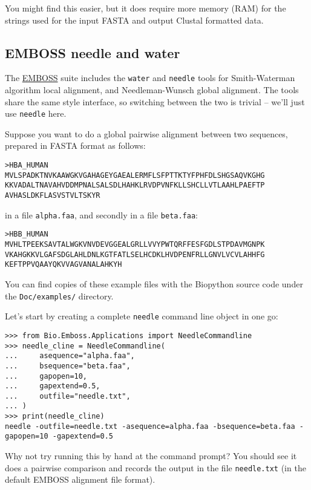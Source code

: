You might find this easier, but it does require more memory (RAM) for the strings
used for the input FASTA and output Clustal formatted data.

\subsection{EMBOSS needle and water}
\label{sec:emboss-needle-water}
The \href{http://emboss.sourceforge.net/}{EMBOSS} suite includes the \texttt{water} and
\texttt{needle} tools for Smith-Waterman algorithm local alignment, and Needleman-Wunsch
global alignment. The tools share the same style interface, so switching between the two
is trivial -- we'll just use \texttt{needle} here.

Suppose you want to do a global pairwise alignment between two sequences, prepared in
FASTA format as follows:

\begin{verbatim}
>HBA_HUMAN
MVLSPADKTNVKAAWGKVGAHAGEYGAEALERMFLSFPTTKTYFPHFDLSHGSAQVKGHG
KKVADALTNAVAHVDDMPNALSALSDLHAHKLRVDPVNFKLLSHCLLVTLAAHLPAEFTP
AVHASLDKFLASVSTVLTSKYR
\end{verbatim}

\noindent in a file \texttt{alpha.faa}, and secondly in a file \texttt{beta.faa}:

\begin{verbatim}
>HBB_HUMAN
MVHLTPEEKSAVTALWGKVNVDEVGGEALGRLLVVYPWTQRFFESFGDLSTPDAVMGNPK
VKAHGKKVLGAFSDGLAHLDNLKGTFATLSELHCDKLHVDPENFRLLGNVLVCVLAHHFG
KEFTPPVQAAYQKVVAGVANALAHKYH
\end{verbatim}

You can find copies of these example files with the Biopython source code
under the \verb|Doc/examples/| directory.

Let's start by creating a complete \texttt{needle} command line object in one go:

\begin{verbatim}
>>> from Bio.Emboss.Applications import NeedleCommandline
>>> needle_cline = NeedleCommandline(
...     asequence="alpha.faa",
...     bsequence="beta.faa",
...     gapopen=10,
...     gapextend=0.5,
...     outfile="needle.txt",
... )
>>> print(needle_cline)
needle -outfile=needle.txt -asequence=alpha.faa -bsequence=beta.faa -gapopen=10 -gapextend=0.5
\end{verbatim}

Why not try running this by hand at the command prompt? You should see it does a
pairwise comparison and records the output in the file \texttt{needle.txt} (in the
default EMBOSS alignment file format).

